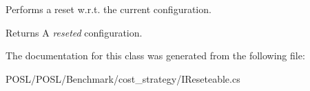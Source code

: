 Performs a reset w.\+r.\+t. the current configuration. 

\begin{DoxyReturn}{Returns}
A {\itshape reseted} configuration. 
\end{DoxyReturn}


The documentation for this class was generated from the following file\+:\begin{DoxyCompactItemize}
\item 
P\+O\+S\+L/\+P\+O\+S\+L/\+Benchmark/cost\+\_\+strategy/I\+Reseteable.\+cs\end{DoxyCompactItemize}
